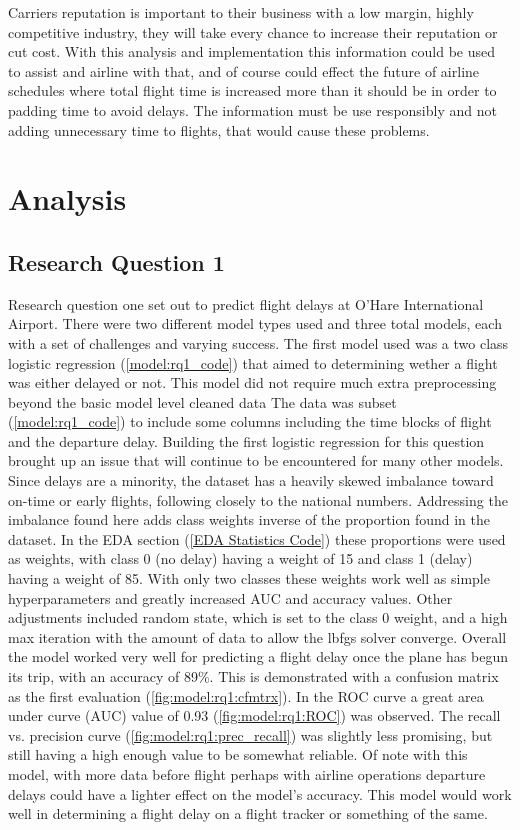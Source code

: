 \documentclass[a4paper,12pt]{article}
\begin{document}
Carriers reputation is important to their business with a low margin, highly competitive industry, they will take every chance to increase their reputation or cut cost.
With this analysis and implementation this information could be used to assist and airline with that, and of course could effect the future of airline schedules where total flight
time is increased more than it should be in order to padding time to avoid delays. The information must be use responsibly and not adding unnecessary time to flights, that
would cause these problems.

\section{Analysis}

\subsection{Research Question 1} \label{analyze:rq1}

Research question one set out to predict flight delays at O'Hare International Airport. There were two different model types used and three total models, each with a set of challenges
and varying success. The first model used was a two class logistic regression (\ref{model:rq1_code}) that aimed to determining wether a flight was either delayed or not.
This model did not require much extra preprocessing beyond the basic model level cleaned data %
The data was subset (\ref{model:rq1_code}) to include some columns including the time blocks of flight and the departure delay.
Building the first logistic regression for this question brought up an issue that will continue to be encountered for many other models. Since delays are a minority, the dataset has a heavily
skewed imbalance toward on-time or early flights, following closely to the national numbers. Addressing the imbalance found here adds class weights inverse of the proportion found in the dataset.
In the EDA section (\ref{EDA Statistics Code}) these proportions were used as weights, with class 0 (no delay) having a weight of 15 and class 1 (delay) having a weight of 85. With only two classes these weights
work well as simple hyperparameters and greatly increased AUC and accuracy values. Other adjustments included random state, which is set to the class 0 weight, and a high max iteration with the amount of data to 
allow the lbfgs solver converge.
Overall the model worked very well for predicting a flight delay once the plane has begun its trip, with an accuracy of 89\%.
This is demonstrated with a confusion matrix as the first evaluation (\ref{fig:model:rq1:cfmtrx}).
In the ROC curve a great area under curve (AUC) value of 0.93 (\ref{fig:model:rq1:ROC}) was observed. The recall vs. precision curve (\ref{fig:model:rq1:prec_recall}) was slightly less promising, but still having a high enough value to be somewhat reliable.
Of note with this model, with more data before flight perhaps with airline operations
departure delays could have a lighter effect on the model's accuracy. This model would work well in determining a flight delay on a flight tracker or something of the same.
\end{document}
